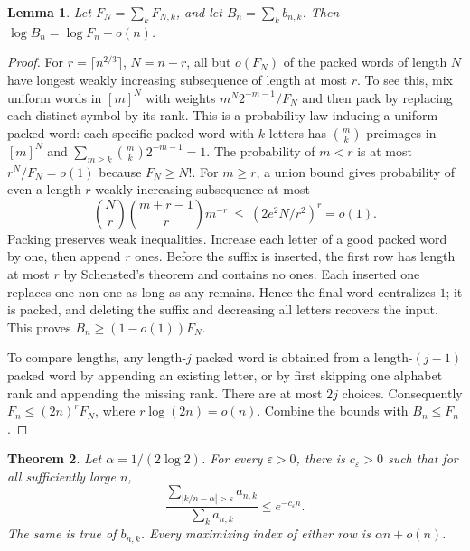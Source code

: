 \documentclass[11pt,a4paper]{article}
\newtheorem{SourceRceKtheorem}{Theorem}
\newtheorem{SourceRceKlemma}[SourceRceKtheorem]{Lemma}
\begin{document}
\begin{SourceRceKlemma}\label{R24K:fixed}
Let $F_N=\sum_kF_{N,k}$, and let $B_n=\sum_k b_{n,k}$. Then
$\log B_n=\log F_n+o(n)$.
\end{SourceRceKlemma}
\begin{proof}
For $r=\lceil n^{2/3}\rceil$, $N=n-r$, all but $o(F_N)$ of the packed words of length $N$ have longest weakly increasing subsequence of length at most $r$. To see this, mix uniform words in $[m]^N$ with weights $m^N 2^{-m-1}/F_N$ and then pack by replacing each distinct symbol by its rank. This is a probability law inducing a uniform packed word: each specific packed word with $k$ letters has $\binom{m}{k}$ preimages in $[m]^N$ and $\sum_{m\ge k}\binom mk2^{-m-1}=1$. The probability of $m<r$ is at most $r^N/F_N=o(1)$ because $F_N\ge N!$. For $m\ge r$, a union bound gives probability of even a length-$r$ weakly increasing subsequence at most
\[
 \binom Nr\binom{m+r-1}r m^{-r}\ \le\ (2e^2N/r^2)^r=o(1).
\]
Packing preserves weak inequalities. Increase each letter of a good packed word by one, then append $r$ ones. Before the suffix is inserted, the first row has length at most $r$ by Schensted's theorem and contains no ones. Each inserted one replaces one non-one as long as any remains. Hence the final word centralizes $1$; it is packed, and deleting the suffix and decreasing all letters recovers the input. This proves $B_n\ge(1-o(1))F_N$.

To compare lengths, any length-$j$ packed word is obtained from a length-$(j-1)$ packed word by appending an existing letter, or by first skipping one alphabet rank and appending the missing rank. There are at most $2j$ choices. Consequently $F_n\le(2n)^r F_N$, where $r\log(2n)=o(n)$. Combine the bounds with $B_n\le F_n$.
\end{proof}
\begin{SourceRceKtheorem}
Let $\alpha=1/(2\log2)$. For every $\varepsilon>0$, there is $c_\varepsilon>0$ such that for all sufficiently large $n$,
\[
 \frac{\sum_{|k/n-\alpha|>\varepsilon} a_{n,k}}{\sum_k a_{n,k}}
 \le e^{-c_\varepsilon n}.
\]
The same is true of $b_{n,k}$. Every maximizing index of either row is $\alpha n+o(n)$.
\end{SourceRceKtheorem}
\end{document}
